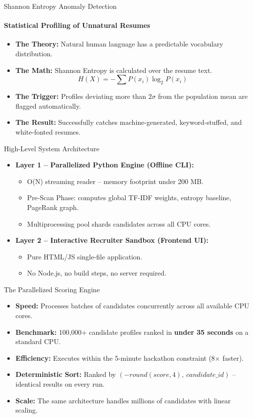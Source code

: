 \documentclass[aspectratio=169]{beamer}
\begin{document}
\begin{frame}{Shannon Entropy Anomaly Detection}
  \framesubtitle{Statistical Profiling of Unnatural Resumes}
  \begin{itemize}
    \item \textbf{The Theory:} Natural human language has a predictable vocabulary distribution.
    \item \textbf{The Math:} Shannon Entropy is calculated over the resume text.
    $$H(X) = -\sum P(x_i) \log_2 P(x_i)$$
    \item \textbf{The Trigger:} Profiles deviating more than $2\sigma$ from the population mean are flagged automatically.
    \item \textbf{The Result:} Successfully catches machine-generated, keyword-stuffed, and white-fonted resumes.
  \end{itemize}
\end{frame}

\begin{frame}{High-Level System Architecture}
  \begin{itemize}
    \item \textbf{Layer 1 -- Parallelized Python Engine (Offline CLI):}
    \begin{itemize}
      \item O(N) streaming reader -- memory footprint under 200 MB.
      \item Pre-Scan Phase: computes global TF-IDF weights, entropy baseline, PageRank graph.
      \item Multiprocessing pool shards candidates across all CPU cores.
    \end{itemize}
    \item \textbf{Layer 2 -- Interactive Recruiter Sandbox (Frontend UI):}
    \begin{itemize}
      \item Pure HTML/JS single-file application.
      \item No Node.js, no build steps, no server required.
    \end{itemize}
  \end{itemize}
\end{frame}

\begin{frame}{The Parallelized Scoring Engine}
  \begin{itemize}
    \item \textbf{Speed:} Processes batches of candidates concurrently across all available CPU cores.
    \item \textbf{Benchmark:} 100,000+ candidate profiles ranked in \textbf{under 35 seconds} on a standard CPU.
    \item \textbf{Efficiency:} Executes within the 5-minute hackathon constraint (8$\times$ faster).
    \item \textbf{Deterministic Sort:} Ranked by $(-round(score, 4),\ candidate\_id)$ -- identical results on every run.
    \item \textbf{Scale:} The same architecture handles millions of candidates with linear scaling.
  \end{itemize}
\end{frame}
\end{document}
